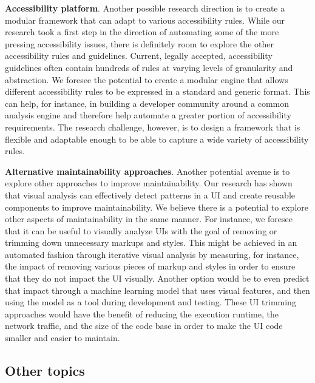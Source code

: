 {\textbf{Accessibility platform}.} 
Another possible research direction is to create a modular framework that can adapt 
to various accessibility rules. While our research took a first step in the direction 
of automating some of the more pressing accessibility issues, there is definitely 
room to explore the other accessibility rules and guidelines. Current, legally accepted, 
accessibility guidelines often contain hundreds of rules at varying levels of granularity 
and abstraction. We foresee the potential to create a modular engine that allows 
different accessibility rules to be expressed in a standard and generic format. 
This can help, for instance, in building a developer community around a common analysis 
engine and therefore help automate a greater portion of accessibility requirements. 
The research challenge, however, is to design a framework that is flexible and adaptable 
enough to be able to capture a wide variety of accessibility rules. 

{\textbf{Alternative maintainability approaches}.} 
Another potential avenue is to explore other approaches to improve maintainability. 
Our research has shown that visual analysis can effectively detect patterns in a UI and 
create reusable components to improve maintainability. We believe 
there is a potential to explore other aspects of maintainability in the same manner. 
For instance, we foresee that it can be useful to visually analyze UIs with the goal of removing or trimming down unnecessary markups and styles. This might be achieved in an automated fashion through iterative visual analysis by measuring, for instance, the impact of removing various pieces of markup and styles 
in order to ensure that they do not impact the UI visually. 
Another option would be to even predict that impact through a machine learning model that uses visual features, and then using the model as a tool during development and testing. 
These UI trimming approaches would have the benefit of reducing the execution runtime, the network traffic, and the size of the code base in order to make the UI code smaller and easier to maintain.  


\stoptocentries
\subsection{Other topics}

